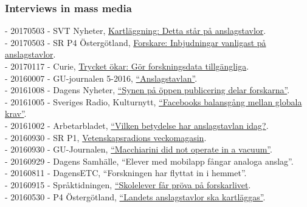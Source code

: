 \documentclass[a4paper,11pt,oneside]{article}
\begin{document}
    \subsubsection{Interviews in mass media}

    - 20170503 - SVT Nyheter, \href{https://www.svt.se/nyheter/lokalt/vast/elever-har-kartlagt-anslagstavlor-i-hela-landet}{Kartläggning: Detta står på anslagstavlor}. \\
    - 20170503 - SR P4 Östergötland, \href{http://t.sr.se/2pdhEBb}{Forskare: Inbjudningar vanligast på anslagstavlor}.\\
    - 20170117 - Curie, \href{http://www.tidningencurie.se/nyheter/2017/01/17/trycket-okar-gor-forskningsdata-tillgangliga/}{Trycket ökar: Gör forskningsdata tillgängliga}.\\
    - 20160007 - GU-journalen 5-2016, \href{https://issuu.com/universityofgothenburg/docs/gu-journalen5-2016/34}{``Anslagstavlan''}.\\
    - 20161008 - Dagens Nyheter, \href{http://www.dn.se/nyheter/sverige/synen-pa-oppen-publicering-delar-forskarna/}{``Synen på öppen publicering delar forskarna''}.\\
    - 20161005 - Sveriges Radio, Kulturnytt, \href{http://sverigesradio.se/sida/artikel.aspx?programid=478&artikel=6533649}{``Facebooks balansgång mellan globala krav''}.\\
    - 20161002 - Arbetarbladet, \href{http://www.arbetarbladet.se/gavleborg/sandviken/vilken-betydelse-har-anslagstavlan-i-dag}{``Vilken betydelse har anslagstavlan idag?}.\\
    - 20160930 - SR P1, \href{http://t.sr.se/2dszL0a}{Vetenskapsradions veckomagasin}.\\
    - 20160930 - GU-Journalen, \href{https://issuu.com/universityofgothenburg/docs/guj4-2016}{``Macchiarini did not operate in a vacuum''}.\\
    - 20160929 - Dagens Samhälle, ``Elever med mobilapp fångar analoga anslag''.\\
    - 20160811 - DagensETC, ``Forskningen har flyttat in i hemmet''. \\
    - 20160915 - Språktidningen, \href{http://spraktidningen.se/blogg/skolelever-far-prova-pa-forskarlivet}{``Skolelever får pröva på forskarlivet}.\\
    - 20160530 - P4 Östergötland, \href{http://t.sr.se/1NY9nMZ}{``Landets anslagstavlor ska kartläggas''}. \\
\end{document}
